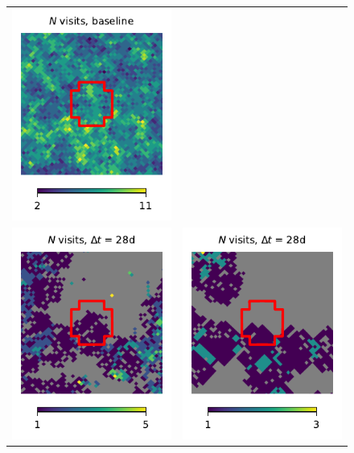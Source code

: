 \documentclass[preprintm,linenumbers]{aastex631}
\begin{document}
\begin{figure}
\begin{tabular}{@{}c@{}c@{}}
				\includegraphics{results/skymaps_cutout/skymaps_cutout_first_year_one_snap_v4_0_10yrs_db_noDD_noTwi_nside-256_CountMetric_g_WFD_noDD_noTwi.pdf} \\
				\includegraphics{results/skymaps_cutout/skymaps_cutout_first_year_one_snap_v4_0_10yrs_db_noDD_noTwi_tscale-28_nside-256_doAllTemplateMetrics_reduceCount_g_NES_noDD_noTwi.pdf} &
				\includegraphics{results/skymaps_cutout/skymaps_cutout_first_year_one_snap_v4_0_10yrs_db_noDD_noTwi_tscale-28_nside-256_doAllTemplateMetrics_reduceCount_g_WFD_noDD_noTwi.pdf} \\

\end{tabular}
\end{figure}
\end{document}
